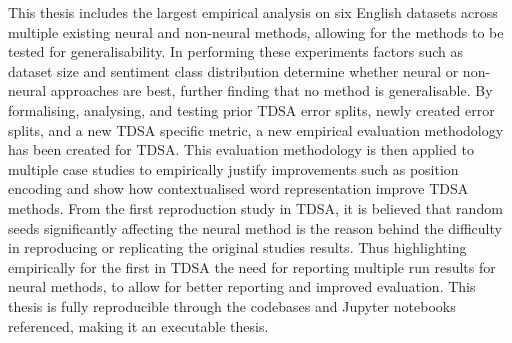 This thesis includes the largest empirical analysis on six English datasets across multiple existing neural and non-neural methods, allowing for the methods to be tested for generalisability. In performing these experiments factors such as dataset size and sentiment class distribution determine whether neural or non-neural approaches are best, further finding that no method is generalisable. By formalising, analysing, and testing prior TDSA error splits, newly created error splits, and a new TDSA specific metric, a new empirical evaluation methodology has been created for TDSA. This evaluation methodology is then applied to multiple case studies to empirically justify improvements such as position encoding and show how contextualised word representation improve TDSA methods. From the first reproduction study in TDSA, it is believed that random seeds significantly affecting the neural method is the reason behind the difficulty in reproducing or replicating the original studies results. Thus highlighting empirically for the first in TDSA the need for reporting multiple run results for neural methods, to allow for better reporting and improved evaluation. This thesis is fully reproducible through the codebases and Jupyter notebooks referenced, making it an executable thesis.







